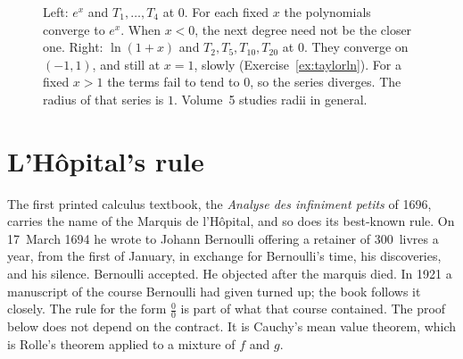 \begin{figure}[ht]
\centering
{}
\caption{Left: $e^x$ and $T_1,\dots,T_4$ at $0$. For each fixed $x$ the polynomials converge to $e^x$. When $x<0$, the next degree need not be the closer one. Right: $\ln(1+x)$ and $T_2,T_5,T_{10},T_{20}$ at $0$. They converge on $(-1,1)$, and still at $x=1$, slowly (Exercise~\ref{ex:taylorln}). For a fixed $x>1$ the terms fail to tend to $0$, so the series diverges. The radius of that series is $1$. Volume~5 studies radii in general.}
\label{fig:taylorexp}
\end{figure}

\section{L'H\^opital's rule}

The first printed calculus textbook, the \emph{Analyse des infiniment petits} of 1696, carries the name of the Marquis de l'H\^opital, and so does its best-known rule. On 17~March 1694 he wrote to Johann Bernoulli offering a retainer of 300~livres a year, from the first of January, in exchange for Bernoulli's time, his discoveries, and his silence. Bernoulli accepted. He objected after the marquis died. In 1921 a manuscript of the course Bernoulli had given turned up; the book follows it closely. The rule for the form $\frac00$ is part of what that course contained. The proof below does not depend on the contract. It is Cauchy's mean value theorem, which is Rolle's theorem applied to a mixture of $f$ and $g$.

